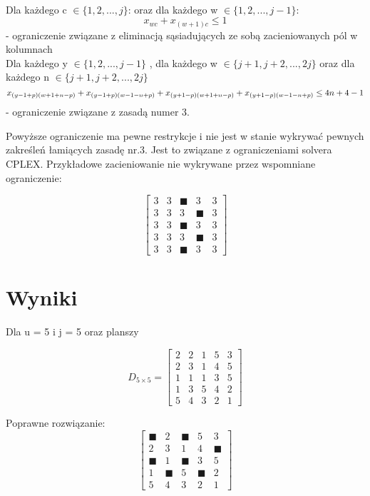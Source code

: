 \documentclass{article}
\begin{document}
\\
Dla każdego c $\in\{1, 2, ..., j\}$:
    oraz dla każdego w $\in\{1, 2, ..., j-1\}$:
        \begin{equation}
        x_{wc} + x_{(w+1)c} \leq 1
        \end{equation} - ograniczenie związane z eliminacją sąsiadujących ze sobą zacieniowanych pól w kolumnach
\\
Dla każdego y $\in\{1, 2, ..., j - 1\}$
    , dla każdego w $\in\{j+1, j+2, ..., 2j\}$
        oraz dla każdego n $\in\{j+1, j+2, ..., 2j\}$
        \begin{equation}
            x_{(y-1+p)(w+1+n-p)} \\
            + x_{(y-1+p)(w-1-n+p)} \\
            + x_{(y+1-p)(w+1+n-p)} \\
            + x_{(y+1-p)(w-1-n+p)} \leq 4n+ 4 - 1
            \end{equation} - ograniczenie związane z zasadą numer 3.

Powyższe ograniczenie ma pewne restrykcje i nie jest w stanie wykrywać pewnych zakreśleń łamiących zasadę nr.3. Jest to związane z ograniczeniami solvera CPLEX. Przykładowe zacieniowanie nie wykrywane przez wspomniane ograniczenie:

$$ \begin{bmatrix}
3 & 3 & \blacksquare & 3 & 3 \\
3 & 3 & 3 & \blacksquare & 3 \\
3 & 3 & \blacksquare & 3 & 3 \\
3 & 3 & 3 & \blacksquare & 3 \\
3 & 3 & \blacksquare & 3 & 3 
\end{bmatrix}  $$

\section{Wyniki}

Dla u = 5 i j = 5 oraz planszy

$$ D_{5\times 5} = \begin{bmatrix}
2 & 2 & 1 & 5 & 3 \\
2 & 3 & 1 & 4 & 5 \\
1 & 1 & 1 & 3 & 5 \\
1 & 3 & 5 & 4 & 2 \\
5 & 4 & 3 & 2 & 1 
\end{bmatrix}  $$

Poprawne rozwiązanie:
$$ \begin{bmatrix}
\blacksquare & 2 & \blacksquare & 5 & 3 \\
2 & 3 & 1 & 4 & \blacksquare \\
\blacksquare & 1 & \blacksquare & 3 & 5 \\
1 & \blacksquare & 5 & \blacksquare & 2 \\
5 & 4 & 3 & 2 & 1 
\end{bmatrix}  $$
\end{document}
